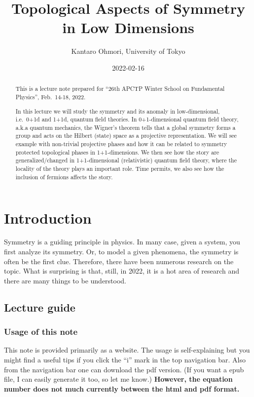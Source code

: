 \documentclass[
]{scrartcl}
\title{Topological Aspects of Symmetry in Low Dimensions}
\author{Kantaro Ohmori, University of Tokyo}
\date{2022-02-16}
\numberwithin{equation}{section}
\theoremstyle{definition}
\theoremstyle{definition}
\theoremstyle{definition}
\theoremstyle{definition}
\theoremstyle{remark}
\begin{document}
\maketitle
\begin{abstract}
This is a lecture note prepared for ``26th APCTP Winter School on Fundamental Physics'', Feb.~14-18, 2022.

In this lecture we will study the symmetry and its anomaly in low-dimensional, i.e.~0+1d and 1+1d, quantum field theories.
In 0+1-dimensional quantum field theory, a.k.a quantum mechanics, the Wigner's theorem tells that a global symmetry forms a group and acts on the Hilbert (state) space as a projective representation. We will see example with non-trivial projective phases and how it can be related to symmetry protected topological phases in 1+1-dimensions. We then see how the story are generalized/changed in 1+1-dimensional (relativistic) quantum field theory, where the locality of the theory plays an important role.
Time permits, we also see how the inclusion of fermions affects the story.
\end{abstract}

{
\setcounter{tocdepth}{2}
\tableofcontents
}
\hypertarget{introduction}{%
\section{Introduction}\label{introduction}}

Symmetry is a guiding principle in physics. In many case, given a system, you first analyze its symmetry. Or, to model a given phenomena, the symmetry is often be the first clue.
Therefore, there have been numerous research on the topic. What is surprising is that, still, in 2022, it is a hot area of research and there are many things to be understood.

\hypertarget{lecture-guide}{%
\subsection{Lecture guide}\label{lecture-guide}}

\hypertarget{usage-of-this-note}{%
\subsubsection{Usage of this note}\label{usage-of-this-note}}

This note is provided primarily as a website.
The usage is self-explaining but you might find a useful tips if you click the ``i'' mark in the top navigation bar. Also from the navigation bar one can download the pdf version. (If you want a epub file, I can easily generate it too, so let me know.) \textbf{However, the equation number does not much currently between the html and pdf format.}
\end{document}
